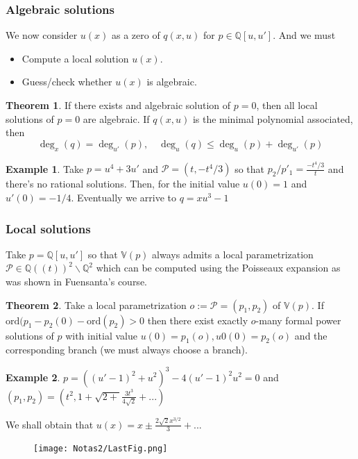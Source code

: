 \documentclass{article}
\theoremstyle{definition}
\newtheorem{thm}{Theorem}
\newtheorem{ex}{Example}
\newcommand{\Q}{\mathbb{Q}}
\begin{document}
\subsubsection{Algebraic solutions}
We now consider $u(x)$ as a zero of $q(x,u)$ for $p\in\Q[u,u']$. And we must
\begin{itemize}
    \item Compute a local solution $u(x)$.
    \item Guess/check whether $u(x)$ is algebraic.
\end{itemize}
\begin{thm}
    If there exists and algebraic solution of $p=0$, then all local solutions of $p=0$ are algebraic. If $q(x,u)$ is the minimal polynomial associated, then $$\deg_x(q)=\deg_{u'}(p),\quad\deg_u(q)\leq\deg_u(p)+\deg_{u'}(p)$$
\end{thm}
\begin{ex}
    Take $p=u^4+3u'$ and $\mathcal P=(t,-t^4/3)$ so that $p_2/p'_1=\frac{-t^4/3}{t}$ and there's no rational solutions. Then, for the initial value $u(0)=1$ and $u'(0)=-1/4$. Eventually we arrive to $q=xu^3-1$
\end{ex}
\subsubsection{Local solutions}
Take $p=\Q[u,u']$ so that $\mathbb V(p)$ always admits a local parametrization $\mathcal P\in\Q((t))^2\backslash\Q^2$ which can be computed using the Poisseaux expansion as was shown in Fuensanta's course.
\begin{thm}
    Take a local parametrization $o:=\mathcal P=(p_1,p_2)$ of $\mathbb V(p)$. If $\text{ord}(p_1-p_2(0)-\text{ord}(p_2)>0$ then there exist exactly $o$-many formal power solutions of $p$ with initial value $u(0)=p_1(o),u0(0)=p_2(o)$ and the corresponding branch (we must always choose a branch).
\end{thm}
\begin{ex}
    $p=((u'-1)^2+u^2)^3-4(u'-1)^2u^2=0$ and $(p_1,p_2)=(t^2,1+\sqrt{2+}\frac{3t^3}{4\sqrt{2}}+...)$\par
We shall obtain that $u(x)=x\pm\frac{2\sqrt2x^{3/2}}{3}+...$
\begin{figure}[H]
    \centering
    \texttt{[image: Notas2/LastFig.png]}
\end{figure}
\end{ex}
\newpage
\end{document}
